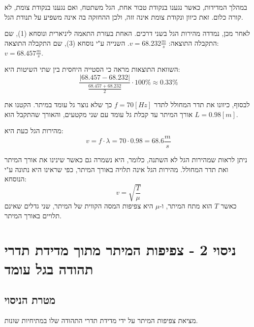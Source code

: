 \documentclass[14pt]{extarticle}
\begin{document}
במהלך המדידות, כאשר נגענו בנקודת טבור אחת, הגל משתטח, ואם נגענו בנקודת צומת, לא קורה כלום. זאת כיוון ונקודת צומת אינה זזה, ולכן ההחזקה בה אינה משפיע על תנודת הגל.

לאחר מכן, נמדדה מהירות הגל בשני דרכים. האחת בעזרת התאמה ליניארית ונוסחא (1), שם התקבלה התוצאה: $v = 68.232 \frac{m}{s}$.
השנייה ע"י נוסחא (3), שם התקבלה התוצאה: $v = 68.457 \frac{m}{s}$.

השוואת התוצאות מראה כי הסטייה היחסית בין שתי השיטות היא:
\begin{equation*}
    \frac{|68.457 - 68.232|}{\frac{68.457 + 68.232}{2}} \cdot 100\% \approx 0.33\%
\end{equation*}

לבסוף, כיוונו את תדר המחולל לתדר $f=70[Hz]$ כך שלא נוצר גל עומד במיתר. הקטנו את אורך המיתר עד קבלת גל עומד עם שני מקטעים, והאורך שהתקבל הוא $L=0.98[m]$.

מהירות הגל כעת היא:
\begin{equation*}
    v = f \cdot \lambda = 70 \cdot 0.98 = 68.6 \frac{m}{s}
\end{equation*}

ניתן לראות שמהירות הגל לא השתנה, כלומר, היא נשמרה גם כאשר שינינו את אורך המיתר ואת תדר המחולל. מהירות הגל אינה תלויה באורך המיתר, כפי שראינו היא נתונה ע"י הנוסחא:
\begin{equation*}
    v=\sqrt{\frac{T}{\mu}}
\end{equation*}
כאשר $T$ הוא מתח המיתר, ו-$\mu$ היא צפיפות המסה הקווית של המיתר, שני גדלים שאינם תלויים באורך המיתר.

\section*{ניסוי 2 - צפיפות המיתר מתוך מדידת תדרי תהודה בגל עומד}
\subsection*{מטרת הניסוי}
מציאת צפיפות המיתר על ידי מדידת תדרי התהודה שלו במתיחיות שונות.
\end{document}
